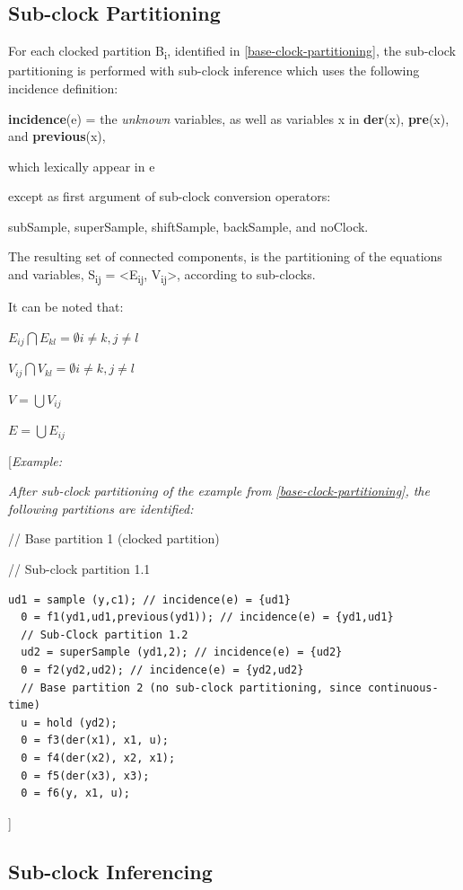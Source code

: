 \documentclass[10pt,a4paper]{report}
\def\doublelabel#1{\label{#1}\hypertarget{#1}{}}
\begin{document}
\subsection{Sub-clock Partitioning}\doublelabel{sub-clock-partitioning}

For each clocked partition B\textsubscript{i}, identified in 
\ref{base-clock-partitioning}, the sub-clock partitioning is performed with sub-clock inference
which uses the following incidence definition:

\textbf{incidence}(e) = the \emph{unknown} variables, as well as
variables x in \textbf{der}(x), \textbf{pre}(x), and
\textbf{previous}(x),

which lexically appear in e

except as first argument of sub-clock conversion operators:

subSample, superSample, shiftSample, backSample, and noClock.

The resulting set of connected components, is the partitioning of the
equations and variables, S\textsubscript{ij} =
\textless{}E\textsubscript{ij}, V\textsubscript{ij}\textgreater{},
according to sub-clocks.

It can be noted that:

$E_{ij} \bigcap E_{kl} = $$\emptyset i\ne{}k, j\ne{}l$

$ V_{ij} \bigcap V_{kl} = $$\emptyset i\ne{}k, j\ne{}l$

$V = \bigcup V_{ij}$

$E = \bigcup E_{ij}$

{[}\emph{Example:}

\emph{After sub-clock partitioning of the example from \ref{base-clock-partitioning}, the following partitions are identified:}

// Base partition 1 (clocked partition)

// Sub-clock partition 1.1

\begin{lstlisting}[language=modelica]
  ud1 = sample (y,c1); // incidence(e) = {ud1}
  0 = f1(yd1,ud1,previous(yd1)); // incidence(e) = {yd1,ud1}
  // Sub-Clock partition 1.2
  ud2 = superSample (yd1,2); // incidence(e) = {ud2}
  0 = f2(yd2,ud2); // incidence(e) = {yd2,ud2}
  // Base partition 2 (no sub-clock partitioning, since continuous-time)
  u = hold (yd2);
  0 = f3(der(x1), x1, u);
  0 = f4(der(x2), x2, x1);
  0 = f5(der(x3), x3);
  0 = f6(y, x1, u);
\end{lstlisting}
{]}

\subsection{Sub-clock Inferencing}\doublelabel{sub-clock-inferencing}
\end{document}

